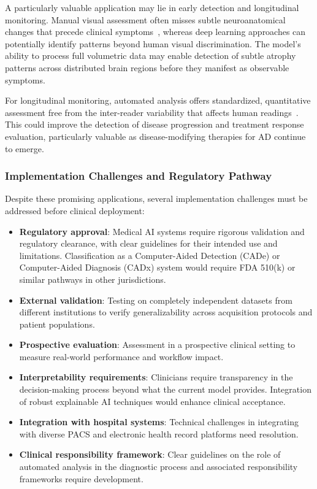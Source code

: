 \documentclass[12pt, a4paper]{article}
\begin{document}
A particularly valuable application may lie in early detection and longitudinal monitoring. Manual visual assessment often misses subtle neuroanatomical changes that precede clinical symptoms~\cite{vemuri2010role}, whereas deep learning approaches can potentially identify patterns beyond human visual discrimination. The model's ability to process full volumetric data may enable detection of subtle atrophy patterns across distributed brain regions before they manifest as observable symptoms.

For longitudinal monitoring, automated analysis offers standardized, quantitative assessment free from the inter-reader variability that affects human readings~\cite{kloppel2008accuracy}. This could improve the detection of disease progression and treatment response evaluation, particularly valuable as disease-modifying therapies for AD continue to emerge.

\subsubsection{Implementation Challenges and Regulatory Pathway}

Despite these promising applications, several implementation challenges must be addressed before clinical deployment:

\begin{itemize}
    \item \textbf{Regulatory approval}: Medical AI systems require rigorous validation and regulatory clearance, with clear guidelines for their intended use and limitations. Classification as a Computer-Aided Detection (CADe) or Computer-Aided Diagnosis (CADx) system would require FDA 510(k) or similar pathways in other jurisdictions.
    
    \item \textbf{External validation}: Testing on completely independent datasets from different institutions to verify generalizability across acquisition protocols and patient populations.
    
    \item \textbf{Prospective evaluation}: Assessment in a prospective clinical setting to measure real-world performance and workflow impact.
    
    \item \textbf{Interpretability requirements}: Clinicians require transparency in the decision-making process beyond what the current model provides. Integration of robust explainable AI techniques would enhance clinical acceptance.
    
    \item \textbf{Integration with hospital systems}: Technical challenges in integrating with diverse PACS and electronic health record platforms need resolution.
    
    \item \textbf{Clinical responsibility framework}: Clear guidelines on the role of automated analysis in the diagnostic process and associated responsibility frameworks require development.
\end{itemize}
\end{document}
